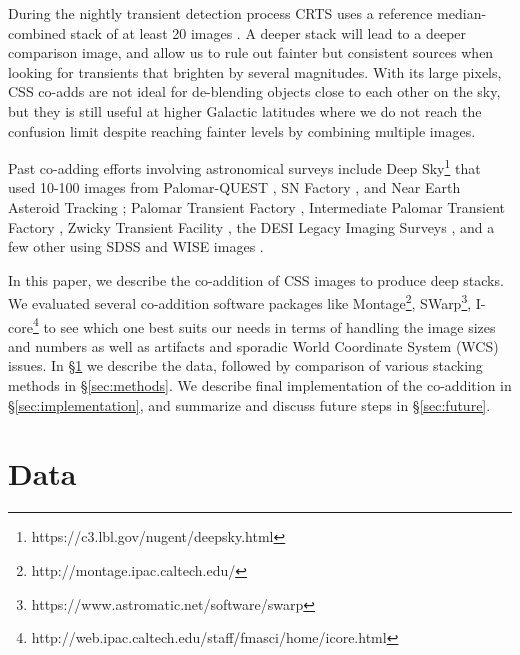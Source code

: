 \documentclass[fleqn,usenatbib]{mnras}
\begin{document}
During the nightly transient detection process CRTS uses a reference median-combined stack of at least 20 images \citep{Drake2009}. A deeper stack will lead to a deeper comparison image, and allow us to rule out fainter but consistent sources when looking for transients that brighten by several magnitudes. With its large pixels, CSS co-adds are not ideal for de-blending objects close to each other on the sky, but they is still useful at higher Galactic latitudes where we do not reach the confusion limit despite reaching fainter levels by combining multiple images.

Past co-adding efforts involving astronomical surveys include Deep Sky\footnote{https://c3.lbl.gov/nugent/deepsky.html} that used 10-100 images from Palomar-QUEST \citep{Djorgovski2008}, SN Factory \citep{Aldering2002}, and Near Earth Asteroid Tracking \citep{Pravdo1999};  
Palomar Transient Factory \citep[PTF;][]{2009PASP..121.1395L}, Intermediate Palomar Transient Factory \citep[iPTF;][]{2016PASP..128k4502C}, Zwicky Transient Facility \citep[ZTF;][]{2014htu..conf...27B}, the DESI Legacy Imaging Surveys \citep{2019AJ....157..168D}, 
and a few other using SDSS and WISE images \citep{Annis2014,Lang2014,Meisner2017a,Meisner2017b}.

In this paper, we describe the co-addition of CSS images to produce deep stacks. We evaluated several co-addition software packages like Montage\footnote{http://montage.ipac.caltech.edu/}, SWarp\footnote{https://www.astromatic.net/software/swarp}, I-core\footnote{http://web.ipac.caltech.edu/staff/fmasci/home/icore.html} to see which one best suits our needs in terms of handling the image sizes and numbers as well as artifacts and sporadic World Coordinate System (WCS) issues. In \S\ref{sec:data} we describe the data, followed by comparison of various stacking methods in \S\ref{sec:methods}. We describe final implementation of the co-addition in \S\ref{sec:implementation}, and summarize and discuss future steps in \S\ref{sec:future}. 

\section{Data}\label{sec:data}
\end{document}
